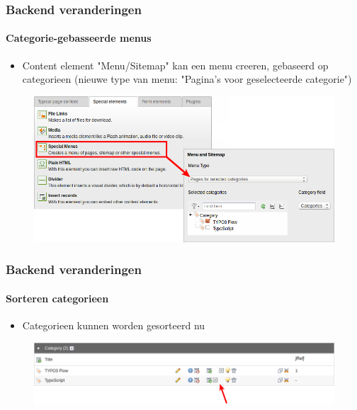 
\begin{frame}[fragile]
	\frametitle{Backend veranderingen}
	\framesubtitle{Categorie-gebasseerde menus}

	\begin{itemize}
		\item Content element "Menu/Sitemap" kan een menu creeren, gebaseerd op categorieen
			(nieuwe type van menu: "Pagina's voor geselecteerde categorie")
	\end{itemize}

	\begin{figure}
		\includegraphics[width=0.8\linewidth]{Images/BackendChanges/CategoryBasedMenus.png}
	\end{figure}

\end{frame}


\begin{frame}[fragile]
	\frametitle{Backend veranderingen}
	\framesubtitle{Sorteren categorieen}

 	\begin{itemize}
		\item Categorieen kunnen worden gesorteerd nu
	\end{itemize}

	\begin{figure}
		\includegraphics[width=0.95\linewidth]{Images/BackendChanges/CategorySorting.png}
	\end{figure}

\end{frame}


